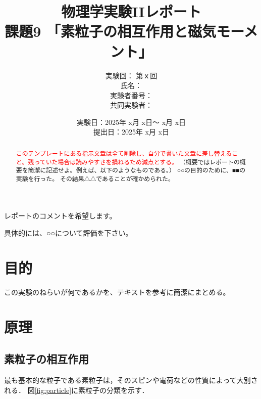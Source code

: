 \documentclass[uplatex,dvipdfmx,a4j,12pt]{jsarticle}
\title{
  物理学実験IIレポート\\    %
  課題9 「素粒子の相互作用と磁気モーメント」
  }
\author{
  実験回： 第ｘ回 \\
  氏名： \\
  実験者番号：
  \\
  共同実験者：
  }
\date{
  実験日：2025年 x月 x日～ x月 x日 \\
  提出日：2025年 x月 x日}  %
\begin{document}
\maketitle


\vspace{2em}
\begin{center}
    \begin{minipage}{0.5\linewidth}
        レポートのコメントを希望します。

        具体的には、○○について評価を下さい。
    \end{minipage}
\end{center}

\vspace{5em}  


%
\begin{abstract}
    \textcolor{red}{このテンプレートにある指示文章は全て削除し、自分で書いた文章に差し替えること。残っていた場合は読みやすさを損ねるため減点とする。}
    （概要ではレポートの概要を簡潔に記述せよ。例えば、以下のようなものである。）
    ○○の目的のために、■■の実験を行った。
    その結果△△であることが確かめられた。
\end{abstract}

\newpage


\section{目的}
この実験のねらいが何であるかを、テキストを参考に簡潔にまとめる。


\section{原理}
\subsection{素粒子の相互作用}
最も基本的な粒子である素粒子は，そのスピンや電荷などの性質によって大別される．
図\ref{fig:particle}に素粒子の分類を示す．
\end{document}
